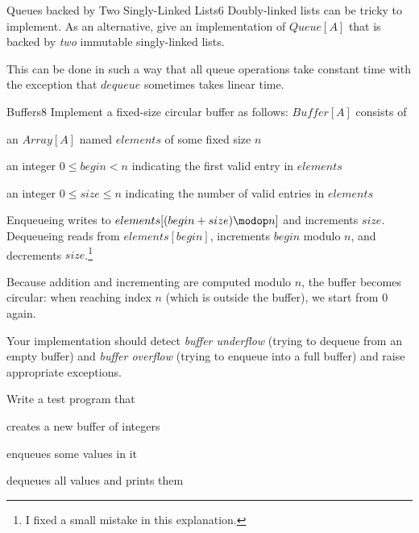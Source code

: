 \documentclass[a4paper]{article}
\begin{document}
\begin{problem}{Queues backed by Two Singly-Linked Lists}{6}
Doubly-linked lists can be tricky to implement.
As an alternative, give an implementation of $Queue[A]$ that is backed by \emph{two} immutable singly-linked lists.

This can be done in such a way that all queue operations take constant time with the exception that $dequeue$ sometimes takes linear time.
\end{problem}

\begin{problem}{Buffers}{8}
Implement a fixed-size circular buffer as follows: $\mathit{Buffer}[A]$ consists of
\begin{compactitem}
 \item an $Array[A]$ named $elements$ of some fixed size $n$
 \item an integer $0\leq begin <n$ indicating the first valid entry in $elements$
 \item an integer $0\leq size\leq n$ indicating the number of valid entries in $elements$
\end{compactitem}
Enqueueing writes to $elements[(begin+size)\modop n]$ and increments $size$.
Dequeueing reads from $elements[begin]$, increments $begin$ modulo $n$, and decrements $size$.\footnote{I fixed a small mistake in this explanation.}

Because addition and incrementing are computed modulo $n$, the buffer becomes circular: when reaching index $n$ (which is outside the buffer), we start from $0$ again.

Your implementation should detect \emph{buffer underflow} (trying to dequeue from an empty buffer) and \emph{buffer overflow} (trying to enqueue into a full buffer) and raise appropriate exceptions.

Write a test program that
\begin{compactitem}
 \item creates a new buffer of integers
 \item enqueues some values in it
 \item dequeues all values and prints them
\end{compactitem}
\end{problem}
\end{document}
